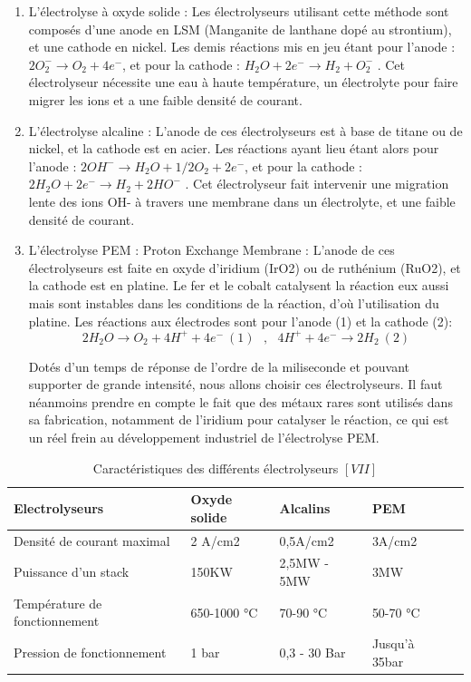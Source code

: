 \documentclass[11pt,french,a4paper]{article}
\begin{document}
\begin{enumerate}
\item L’électrolyse à oxyde solide : Les électrolyseurs utilisant cette méthode sont composés d’une anode en LSM (Manganite de lanthane dopé au strontium), et une cathode en nickel. Les demis réactions mis en jeu étant pour l’anode :  $2 O_2^- \rightarrow O_2 + 4 e^- $, et pour la cathode : $H_2O + 2 e^- \rightarrow H_2 + O_2^- $ . Cet électrolyseur nécessite une eau à haute température, un électrolyte pour faire migrer les ions et a une faible densité de courant. \\

\item L’électrolyse alcaline : L’anode de ces électrolyseurs est à base de titane ou de nickel, et la cathode est en acier. Les réactions ayant lieu étant alors pour l’anode :  $2 OH^- \rightarrow H_2O + 1/2 O_2 + 2e^- $, et pour la cathode : $2 H_2O + 2 e^- \rightarrow H_2 +2 HO^- $ . Cet électrolyseur fait intervenir une migration lente des ions OH- à travers une membrane dans un électrolyte, et une faible densité de courant.\\

\item L’électrolyse PEM : Proton Exchange Membrane : L’anode de ces électrolyseurs est faite en oxyde d'iridium (IrO2) ou de ruthénium (RuO2), et la cathode est en platine. Le fer et le cobalt catalysent la réaction eux aussi mais sont instables dans les conditions de la réaction, d’où l’utilisation du platine. Les réactions aux électrodes sont pour l’anode (1) et la cathode (2):  
$$2H_2O \rightarrow O_2 + 4H^+ + 4e^- \  (1) \ \ \ , \ \ \ 4H^+ + 4e^-  \rightarrow 2H_2  \ (2)$$

Dotés d’un temps de réponse de l’ordre de la miliseconde et pouvant supporter de grande intensité, nous allons choisir ces électrolyseurs. Il faut néanmoins prendre en compte le fait que des métaux rares sont utilisés dans sa fabrication, notamment de l'iridium pour catalyser le réaction, ce qui est un réel frein au développement industriel de l'électrolyse PEM.

\end{enumerate}

\begin{table}[h]
\centering
\begin{tabular}{|l|l|l|l|l|}
\hline
Electrolyseurs & Oxyde solide & Alcalins & PEM \\
\hline
Densité de courant maximal & 2 A/cm2 &0,5A/cm2 & 3A/cm2 \\
\hline
Puissance d’un stack & 150KW& 2,5MW - 5MW&3MW \\
\hline
Température de fonctionnement &650-1000 °C&70-90 °C&50-70 °C\\
\hline
Pression de fonctionnement&1 bar& 0,3 - 30 Bar & Jusqu'à 35bar \\
\hline
\end{tabular}
\caption{Caractéristiques des différents électrolyseurs $[VII]$}
\end{table}
\end{document}

